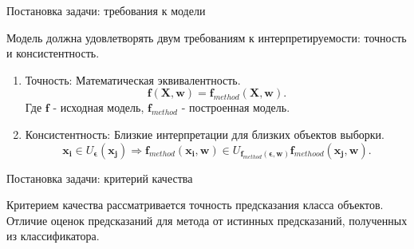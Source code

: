 \documentclass{beamer}
\begin{document}
\begin{frame}{Постановка задачи: требования к модели}

Модель должна удовлетворять двум требованиям к интерпретируемости: $\textbf{точность}$ и $\textbf{консистентность}$.
\begin{enumerate}
   \item{Точность}:
    Математическая эквивалентность.
    $$\mathbf{f}(\mathbf{X}, \mathbf{w}) = \mathbf{f}_{method}(\mathbf{X}, \mathbf{w}).$$ Где $\mathbf{f}$ - исходная модель, $\mathbf{f}_{method}$ - построенная модель.
    \item{Консистентность}:
    Близкие интерпретации для близких объектов выборки. $$\mathbf{x_i} \in U_\mathbf{\epsilon}(\mathbf{x_j}) \Longrightarrow \mathbf{f}_{method}(\mathbf{x_i}, \mathbf{w}) \in U_{\mathbf{f}_{method}(\mathbf{\epsilon}, \mathbf{w})}\mathbf{f}_{methood}(\mathbf{x_j}, \mathbf{w}).$$
\end{enumerate}
\end{frame}
\begin{frame}{Постановка задачи: критерий качества}

Критерием качества рассматривается точность предсказания класса объектов. Отличие оценок предсказаний для метода от истинных предсказаний, полученных из классификатора.

\end{frame}
\end{document}
